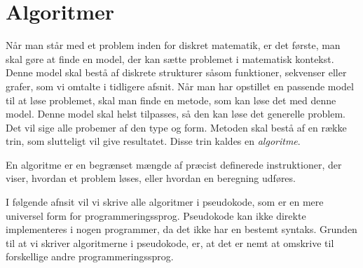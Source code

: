 \chapter{Algoritmer} \label{kap.algo}
Når man står med et problem inden for diskret matematik, er det første, man skal gøre at finde en model, der kan sætte problemet i matematisk kontekst. Denne model skal bestå af diskrete strukturer såsom funktioner, sekvenser eller grafer, som vi omtalte i tidligere afsnit. Når man har opstillet en passende model til at løse problemet, skal man finde en metode, som kan løse det med denne model. Denne model skal helst tilpasses, så den kan løse det generelle problem. Det vil sige alle probemer af den type og form. Metoden skal bestå af en række trin, som slutteligt vil give resultatet. Disse trin kaldes en \emph{algoritme}. 
\begin{defn}
[Algoritmer] En algoritme er en begrænset mængde af præcist definerede instruktioner, der viser, hvordan et problem løses, eller hvordan en beregning udføres. 
\end{defn}
I følgende afnsit vil vi skrive alle algoritmer i pseudokode, som er en mere universel form for programmeringssprog. Pseudokode kan ikke direkte implementeres i nogen programmer, da det ikke har en bestemt syntaks. Grunden til at vi skriver algoritmerne i pseudokode, er, at det er nemt at omskrive til forskellige andre programmeringssprog.





